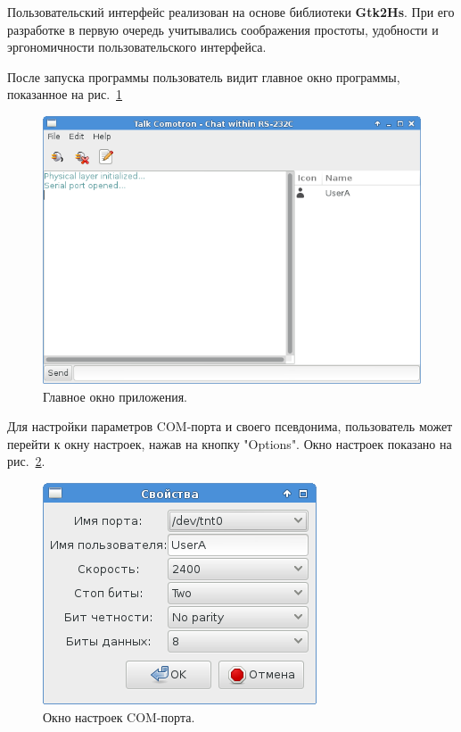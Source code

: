\documentclass[russian,utf8,simple,emptystyle]{eskdtext}
\begin{document}
Пользовательский интерфейс реализован на основе библиотеки \textbf{Gtk2Hs}. При его разработке в первую очередь учитывались соображения простоты, удобности и эргономичности пользовательского интерфейса.

После запуска программы пользователь видит главное окно программы, показанное на рис.~\ref{fig:main-window}

\begin{figure}[!h]
\centering
\includegraphics[scale=0.7]{main_window}
\caption{Главное окно приложения.}
\label{fig:main-window}
\end{figure}

Для настройки параметров COM-порта и своего псевдонима, пользователь может перейти к окну настроек, нажав на кнопку "Options". Окно настроек показано на рис.~\ref{fig:options-window}.

\begin{figure}[!h]
\centering
\includegraphics[scale=0.7]{options_window}
\caption{Окно настроек COM-порта.}
\label{fig:options-window}
\end{figure}
\end{document}

